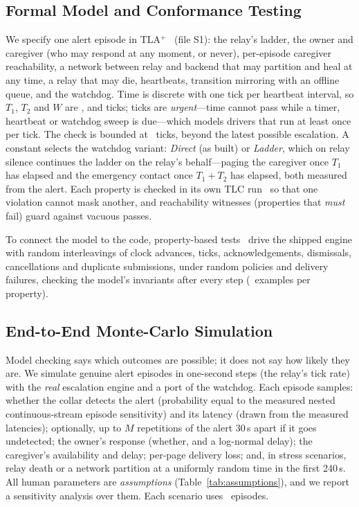 \subsection{Formal Model and Conformance Testing}
\label{sec:formal}
We specify one alert episode in TLA$^+$~\cite{lamport2002specifying} (file S1): the relay's ladder, the owner and caregiver (who may respond at any moment, or never), per-episode caregiver reachability, a network between relay and backend that may partition and heal at any time, a relay that may die, heartbeats, transition mirroring with an offline queue, and the watchdog. Time is discrete with one tick per heartbeat interval, so $T_1$, $T_2$ and $W$ are ,  and  ticks; ticks are \emph{urgent}---time cannot pass while a timer, heartbeat or watchdog sweep is due---which models drivers that run at least once per tick. The check is bounded at ~ticks, beyond the latest possible escalation. A constant selects the watchdog variant: \emph{Direct} (as built) or \emph{Ladder}, which on relay silence continues the ladder on the relay's behalf---paging the caregiver once $T_1$ has elapsed and the emergency contact once $T_1+T_2$ has elapsed, both measured from the alert. Each property is checked in its own TLC run~\cite{yu1999tlc} so that one violation cannot mask another, and reachability witnesses (properties that \emph{must} fail) guard against vacuous passes.

To connect the model to the code, property-based tests~\cite{maciver2019hypothesis} drive the shipped engine with random interleavings of clock advances, ticks, acknowledgements, dismissals, cancellations and duplicate submissions, under random policies and delivery failures, checking the model's invariants after every step (~examples per property).

\subsection{End-to-End Monte-Carlo Simulation}
\label{sec:sim}
Model checking says which outcomes are possible; it does not say how likely they are. We simulate genuine alert episodes in one-second steps (the relay's tick rate) with the \emph{real} escalation engine and a port of the watchdog. Each episode samples: whether the collar detects the alert (probability equal to the measured nested continuous-stream episode sensitivity) and its latency (drawn from the measured latencies); optionally, up to $M$ repetitions of the alert 30\,s apart if it goes undetected; the owner's response (whether, and a log-normal delay); the caregiver's availability and delay; per-page delivery loss; and, in stress scenarios, relay death or a network partition at a uniformly random time in the first 240\,s. All human parameters are \emph{assumptions} (Table~\ref{tab:assumptions}), and we report a sensitivity analysis over them. Each scenario uses ~episodes.

